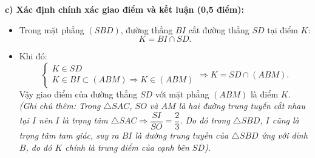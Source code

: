 \documentclass[12pt, a4paper]{article}
\begin{document}
\begin{tcolorbox}[enhanced,breakable,colback=solutionbg,colframe=secondary!50!black,frame hidden,borderline west={3pt}{0pt}{secondary!50!black}]
\textbf{c) Xác định chính xác giao điểm và kết luận (0,5 điểm):}
\begin{itemize}[leftmargin=1.5em]
\item Trong mặt phẳng $(SBD)$, đường thẳng $BI$ cắt đường thẳng $SD$ tại điểm $K$:
$$K = BI \cap SD.$$
\item Khi đó:
$$\begin{cases} K \in SD \\ K \in BI \subset (ABM) \Rightarrow K \in (ABM) \end{cases} \Rightarrow K = SD \cap (ABM).$$
Vậy giao điểm của đường thẳng $SD$ với mặt phẳng $(ABM)$ là điểm $K$.\\
\textit{(Ghi chú thêm: Trong $\triangle SAC$, $SO$ và $AM$ là hai đường trung tuyến cắt nhau tại $I$ nên $I$ là trọng tâm $\triangle SAC \Rightarrow \dfrac{SI}{SO} = \dfrac{2}{3}$. Do đó trong $\triangle SBD$, $I$ cũng là trọng tâm tam giác, suy ra $BI$ là đường trung tuyến của $\triangle SBD$ ứng với đỉnh $B$, do đó $K$ chính là trung điểm của cạnh bên $SD$).}
\end{itemize}
\end{tcolorbox}
\end{document}
